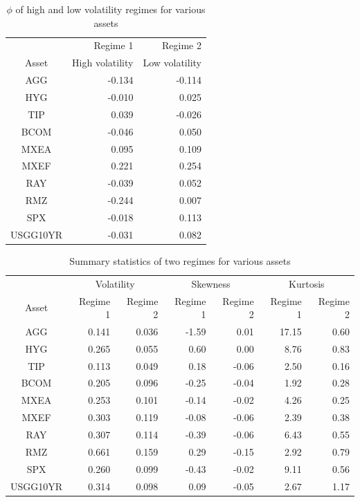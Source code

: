 \documentclass[12pt]{article}
\begin{document}
\begin{table}[!h]
\caption{$\phi$ of high and low volatility regimes for various assets} 
\centering 
\begin{tabular}{ | c || r  r | } 
 \hline
 & Regime 1  & Regime 2\\
Asset & High volatility  & Low volatility \\
  \hline \hline
AGG  & -0.134 & -0.114 \\ 
HYG & -0.010 &  0.025 \\ 
TIP &  0.039  & -0.026 \\ 
BCOM & -0.046 &  0.050 \\ 
MXEA & 0.095 & 0.109 \\ 
MXEF & 0.221 & 0.254 \\ 
RAY& -0.039  &  0.052 \\ 
RMZ & -0.244 &  0.007 \\ 
SPX & -0.018 &  0.113 \\ 
USGG10YR & -0.031 & 0.082 \\ 
 \hline
\end{tabular}
\label{table:autoCoeffRegime}
\end{table}

\begin{table}[!h]
\caption{Summary statistics of two regimes for various assets} 
\centering 
\begin{tabular}{ | c || rr | rr | rr | } 
 \hline
& \multicolumn{2}{c|}{Volatility} & \multicolumn{2}{c|}{Skewness} & \multicolumn{2}{c|}{Kurtosis} \\
Asset & Regime 1 & Regime 2 & Regime 1 & Regime 2 & Regime 1 & Regime 2 \\
  \hline \hline
AGG & 0.141 & 0.036 & -1.59 &  0.01 & 17.15 &  0.60\\ 
HYG & 0.265 & 0.055 &  0.60 &  0.00 &  8.76 &  0.83\\ 
TIP & 0.113 & 0.049 &  0.18 & -0.06 &  2.50 &  0.16\\ 
BCOM & 0.205 & 0.096 & -0.25 & -0.04 &  1.92 &  0.28\\ 
MXEA & 0.253 & 0.101 & -0.14 & -0.02 &  4.26 &  0.25\\ 
MXEF & 0.303 & 0.119 & -0.08 & -0.06 &  2.39 &  0.38\\ 
RAY & 0.307 & 0.114 & -0.39 & -0.06 &  6.43 &  0.55\\ 
RMZ & 0.661 & 0.159 &  0.29 & -0.15 &  2.92 &  0.79\\ 
SPX & 0.260 & 0.099 & -0.43 & -0.02 &  9.11 &  0.56\\ 
USGG10YR & 0.314 & 0.098 &  0.09 & -0.05 &  2.67 &  1.17 \\
 \hline
\end{tabular}
\label{table:statSumRegime}
\end{table}
\end{document}
